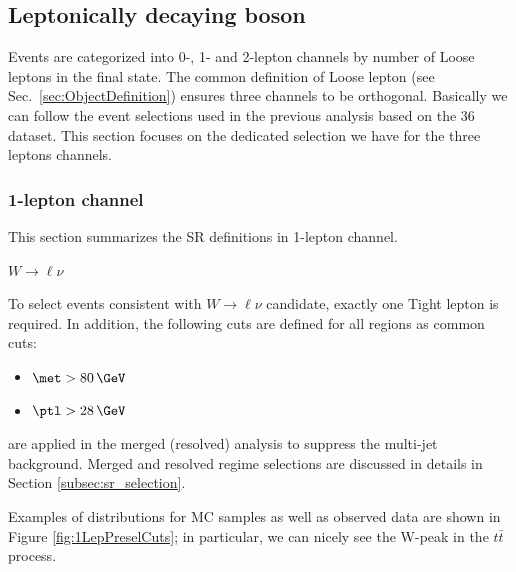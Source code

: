 \subsection{Leptonically decaying boson}
\label{subsec:leptons_selection}

Events are categorized into 0-, 1- and 2-lepton channels by number of Loose leptons in the final state. The common definition of Loose lepton (see Sec.~\ref{sec:ObjectDefinition}) ensures three channels to be orthogonal. 
Basically we can follow the event selections used in the previous analysis based on the 36\,\ifb dataset\cite{Ryzhov:2310214}.
This section focuses on the dedicated selection we have for the three leptons channels.



\clearpage
\subsubsection{1-lepton channel}
\label{subsubsec:1lep_event_selection}
This section summarizes the SR definitions in 1-lepton channel.

\textbf{$W \to \ell\nu$}

To select events consistent with $W \to \ell\nu$ candidate, exactly one Tight lepton is required. In addition,
the following cuts are defined for all regions as common cuts:

\begin{itemize}
\item $\met > 80 \,\GeV$
\item $\ptl > 28 \,\GeV$ %
\end{itemize}
are applied in the merged (resolved) analysis to suppress the multi-jet background.
Merged and resolved regime selections are discussed in details in Section \ref{subsec:sr_selection}.

Examples of distributions for MC samples as well as observed data are shown in Figure \ref{fig:1LepPreselCuts}; in particular, we can nicely see the W-peak in the $t\bar{t}$ process.


